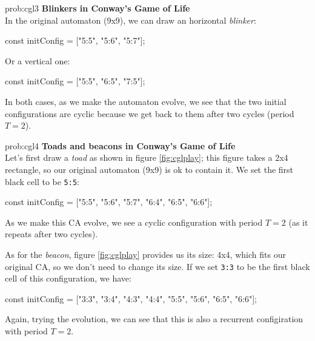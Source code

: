 \begin{sol}{prob:cgl3}
\textbf{Blinkers in Conway's Game of Life}\\
In the original automaton (9x9), we can draw an horizontal \textit{blinker}:
\begin{code}
const initConfig = ["5:5", "5:6", "5:7"];
\end{code}
Or a vertical one:
\begin{code}
const initConfig = ["5:5", "6:5", "7:5"];
\end{code}
In both cases, as we make the automaton evolve, we see that the two initial configurations are
cyclic because we get back to them after two cycles (period $T=2$).
\end{sol}

\begin{sol}{prob:cgl4}
\textbf{Toads and beacons in Conway's Game of Life}\\
Let's first draw a \textit{toad} as shown in figure \ref{fig:cglplay};
this figure takes a 2x4 rectangle, so our original automaton (9x9)
is ok to contain it. We set the first black cell to be \texttt{5:5}:
\begin{code}
const initConfig = ["5:5", "5:6", "5:7", "6:4", "6:5", "6:6"];
\end{code}
As we make this CA evolve, we see a cyclic configuration with period $T=2$
(as it repeats after two cycles).

As for the \textit{beacon}, figure \ref{fig:cglplay} provides us its size: 4x4, which fits
our original CA, so we don't need to change its size. If we set \texttt{3:3} to be the first black
cell of this configuration, we have:
\begin{code}
const initConfig = ["3:3", "3:4", "4:3", "4:4", "5:5", "5:6", "6:5", "6:6"];
\end{code}
Again, trying the evolution, we can see that this is also a recurrent configiration with period $T=2$.
\end{sol}

